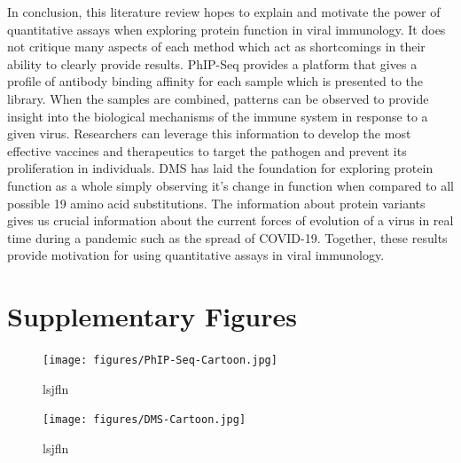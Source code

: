 \documentclass{article}
\begin{document}
In conclusion, this literature review hopes to explain and motivate the power of quantitative assays when exploring protein function in viral immunology.
It does not critique many aspects of each method which act as shortcomings in their ability to clearly provide results.
PhIP-Seq provides a platform that gives a profile of antibody binding affinity for each sample which is presented to the library.
When the samples are combined, patterns can be observed to provide insight into the biological mechanisms of the immune system in response to a given virus.
Researchers can leverage this information to develop the most effective vaccines and therapeutics to target the pathogen and prevent its proliferation in individuals.
DMS has laid the foundation for exploring protein function as a whole simply observing it's change in function when compared to all possible 19 amino acid substitutions.
The information about protein variants gives us crucial information about the current forces of evolution of a virus in real time during a pandemic such as the spread of COVID-19.
Together, these results provide motivation for using quantitative assays in viral immunology.





% 
% 




\section*{Supplementary Figures}

\begin{figure}[h]
\centering
\texttt{[image: figures/PhIP-Seq-Cartoon.jpg]}
\caption{lsjfln}
\label{fig:PhIP-Seq-Cartoon}
\end{figure}

\begin{figure}[h]
\centering
\texttt{[image: figures/DMS-Cartoon.jpg]}
\caption{lsjfln}
\label{fig:DMS-Cartoon}
\end{figure}
\end{document}
